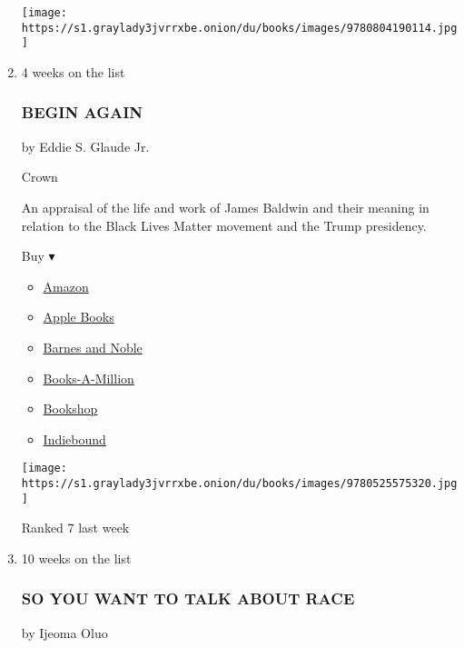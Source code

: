 \begin{enumerate}
  \texttt{[image: https://s1.graylady3jvrrxbe.onion/du/books/images/9780804190114.jpg]}
\item
  4 weeks on the list

  \hypertarget{begin-again}{%
  \subsubsection{BEGIN AGAIN}\label{begin-again}}

  by Eddie S. Glaude Jr.

  Crown

  An appraisal of the life and work of James Baldwin and their meaning
  in relation to the Black Lives Matter movement and the Trump
  presidency.

  Buy ▾

  \begin{itemize}
  \tightlist
  \item
    \href{https://www.amazon.com/dp/0525575324?tag=NYTBSREV-20\&tag=NYTBS-20}{Amazon}
  \item
    \href{https://du-gae-books-dot-nyt-du-prd.appspot.com/buy?title=BEGIN+AGAIN\&author=Eddie+S+Glaude+Jr}{Apple
    Books}
  \item
    \href{https://www.anrdoezrs.net/click-7990613-11819508?url=https\%3A\%2F\%2Fwww.barnesandnoble.com\%2Fw\%2F\%3Fean\%3D9780525575320}{Barnes
    and Noble}
  \item
    \href{https://www.anrdoezrs.net/click-7990613-35140?url=https\%3A\%2F\%2Fwww.booksamillion.com\%2Fp\%2FBEGIN\%2BAGAIN\%2FEddie\%2BS\%2BGlaude\%2BJr\%2F9780525575320}{Books-A-Million}
  \item
    \href{https://bookshop.org/a/3546/9780525575320}{Bookshop}
  \item
    \href{https://www.indiebound.org/book/9780525575320?aff=NYT}{Indiebound}
  \end{itemize}

  \texttt{[image: https://s1.graylady3jvrrxbe.onion/du/books/images/9780525575320.jpg]}

  Ranked 7 last week
\item
  10 weeks on the list

  \hypertarget{so-you-want-to-talk-about-race}{%
  \subsubsection{SO YOU WANT TO TALK ABOUT
  RACE}\label{so-you-want-to-talk-about-race}}

  by Ijeoma Oluo


\end{enumerate}
